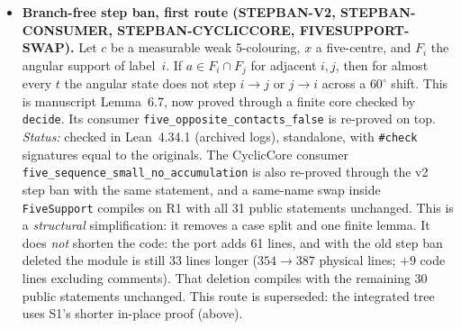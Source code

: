 \documentclass[11pt]{article}
\theoremstyle{definition}
\theoremstyle{remark}
\begin{document}
\begin{itemize}
\item \textbf{Branch-free step ban, first route (STEPBAN-V2, STEPBAN-CONSUMER, STEPBAN-CYCLICCORE, FIVESUPPORT-SWAP).}
Let $c$ be a measurable weak 5-colouring, $x$ a five-centre, and $F_i$ the
angular support of label~$i$. If $a\in F_i\cap F_j$ for adjacent $i,j$, then
for almost every $t$ the angular state does not step $i\to j$ or $j\to i$
across a $60^\circ$ shift. This is manuscript Lemma~6.7, now proved through a
finite core checked by \texttt{decide}. Its consumer
\texttt{five\_\allowbreak{}opposite\_\allowbreak{}contacts\_\allowbreak{}false} is re-proved on top.
\emph{Status:} checked in Lean~4.34.1 (archived logs), standalone, with
\texttt{\#check} signatures equal to the originals. The CyclicCore consumer
\texttt{five\_\allowbreak{}sequence\_\allowbreak{}small\_\allowbreak{}no\_\allowbreak{}accumulation} is also re-proved through the v2 step ban with the
same statement, and a same-name swap inside \texttt{FiveSupport} compiles on
R1 with all 31 public statements unchanged. This is a \emph{structural}
simplification: it removes a case split and one finite lemma. It does
\emph{not} shorten the code: the port adds 61 lines, and with the old step
ban deleted the module is still 33 lines longer ($354\to387$ physical lines;
$+9$ code lines excluding comments). That deletion compiles with the
remaining 30 public statements unchanged. This route is superseded: the
integrated tree uses S1's shorter in-place proof (above).


\end{itemize}
\end{document}
